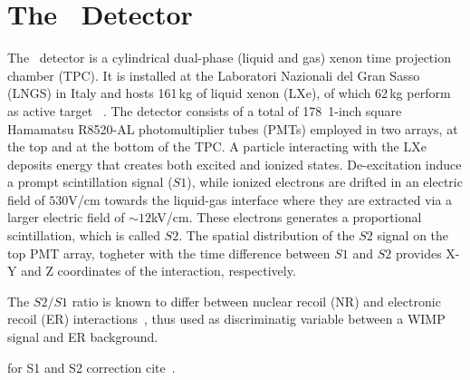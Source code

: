 \section{The \Xehund\  Detector}
The \Xehund\ detector is a cylindrical %
dual-phase (liquid and gas) xenon time projection chamber (TPC). It is installed at the Laboratori Nazionali del Gran Sasso (LNGS) in Italy
and hosts 161\,kg of liquid xenon (LXe), of which 62\,kg perform as active target ~\cite{xe100_instr2012}. 
The detector consists of a total of 178~1-inch square Hamamatsu R8520-AL photomultiplier tubes (PMTs) employed in two arrays, at the top and at the bottom of the TPC. 
A particle interacting with the LXe deposits energy that creates both excited and ionized states. De-excitation induce a prompt scintillation signal ($S1$), while 
ionized electrons are drifted in an electric field of $530$V/cm towards the liquid-gas interface where they are extracted via a larger electric field of $\sim12$kV/cm. 
These electrons generates a proportional scintillation, which is called $S2$. The spatial distribution of the $S2$ signal on the top PMT array, togheter with the 
time difference between $S1$ and $S2$ provides X-Y and Z coordinates of the interaction, respectively. 

The $S2/S1$ ratio is known to differ between nuclear recoil (NR) and electronic recoil (ER) interactions~\cite{}, thus used as  discriminatig variable between a WIMP signal and ER background.

      
for S1 and S2 correction cite~\cite{xe100_instr2012}.
